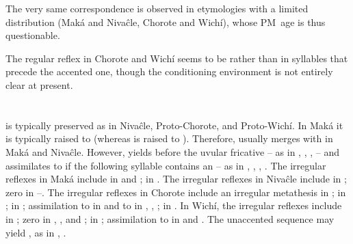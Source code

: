 The very same correspondence is observed in etymologies with a limited distribution (Maká and Nivaĉle, Chorote and Wichí), whose PM~age is thus questionable.

\begin{exe}
    \ex \dreamn
    \ex \hole
    \ex \bilecw
    \ex \queenpalmf
\end{exe}

The regular reflex in Chorote and Wichí seems to be  rather than  in syllables that precede the accented one, though the conditioning environment is not entirely clear at present.

\begin{exe}
    \ex \deep
    \ex \cat
    \ex \duraznillo
    \ex \meat
\end{exe}

\section{}\label{pm-a}
 is typically preserved as  in Nivaĉle, Proto-Chorote, and Proto-Wichí. In Maká it is typically raised to  (whereas  is raised to ). Therefore,  usually merges with  in Maká and Nivaĉle. However,  yields  before the uvular fricative  – as in , , ,  – and assimilates to  if the following syllable contains an  – as in , , , . The irregular reflexes in Maká include  in  and ;  in . The irregular reflexes in Nivaĉle include  in ; zero in --. The irregular reflexes in Chorote include an irregular metathesis in ;  in ;  in ; assimilation to  in  and to  in , , ;  in . In Wichí, the irregular reflexes include  in ; zero in , , and ;  \recvar {} in ; assimilation to  in  and . The unaccented sequence  may yield , as in , .

